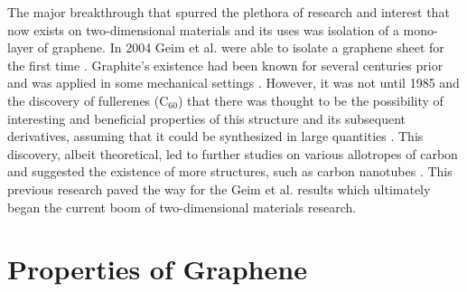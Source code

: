 \documentclass[%
 reprint,
 amsmath,amssymb,
 aps,
pra,
]{revtex4-1}
\begin{document}
The major breakthrough that spurred the plethora of research and interest that now exists on two-dimensional materials and its uses was isolation of a mono-layer of graphene. In 2004 Geim et al. were able to isolate a graphene sheet for the first time \cite{novoselovEtAl2004, novoselovEtAl2005}. Graphite's existence had been known for several centuries prior and was applied in some mechanical settings \cite{nanoscaleReview2011}. However, it was not until 1985 and the discovery of fullerenes ($\mathrm{C}_{60}$) that there was thought to be the possibility of interesting and beneficial properties of this structure and its subsequent derivatives, assuming that it could be synthesized in large quantities \cite{krotoFullerenes1985}. This discovery, albeit theoretical, led to further studies on various allotropes of carbon and suggested the existence of more structures, such as carbon nanotubes \cite{iijimaCarbonNanotubes1991}. This previous research paved the way for the Geim et al. results which ultimately began the current boom of two-dimensional materials research. 

\section{\label{sec:graphene_properties} Properties of Graphene}




\end{document}
